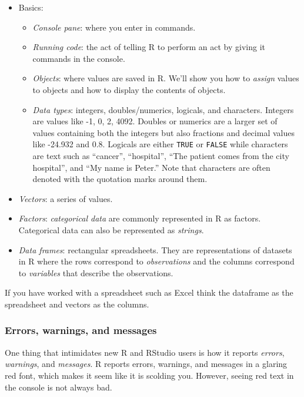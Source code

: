 \documentclass[
]{article}
\providecommand{\tightlist}{%
  \setlength{\itemsep}{0pt}\setlength{\parskip}{0pt}}
\begin{document}
\begin{itemize}
\tightlist
\item
  Basics:

  \begin{itemize}
  \tightlist
  \item
    \emph{Console pane}: where you enter in commands.
  \item
    \emph{Running code}: the act of telling R to perform an act by
    giving it commands in the console.
  \item
    \emph{Objects}: where values are saved in R. We'll show you how to
    \emph{assign} values to objects and how to display the contents of
    objects. 
  \item
    \emph{Data types}: integers, doubles/numerics, logicals, and
    characters.  Integers are values like -1, 0, 2,
    4092. Doubles or numerics are a larger set of values containing both
    the integers but also fractions and decimal values like -24.932 and
    0.8. Logicals are either \texttt{TRUE} or \texttt{FALSE} while
    characters are text such as ``cancer'', ``hospital'', ``The patient
    comes from the city hospital'', and ``My name is Peter.'' Note that
    characters are often denoted with the quotation marks around them.
  \end{itemize}
\item
  \emph{Vectors}: a series of values.
\item
  \emph{Factors}: \emph{categorical data} are commonly represented in R
  as factors. Categorical data can also be represented as
  \emph{strings}.
\item
  \emph{Data frames}: rectangular spreadsheets. They are representations
  of datasets in R where the rows correspond to \emph{observations} and
  the columns correspond to \emph{variables} that describe the
  observations.
\end{itemize}

If you have worked with a spreadsheet such as Excel think the dataframe
as the spreadsheet and vectors as the columns.

\hypertarget{messages}{%
\subsubsection{Errors, warnings, and messages}\label{messages}}

One thing that intimidates new R and RStudio users is how it reports
\emph{errors}, \emph{warnings}, and \emph{messages}. R reports errors,
warnings, and messages in a glaring red font, which makes it seem like
it is scolding you. However, seeing red text in the console is not
always bad.
\end{document}
